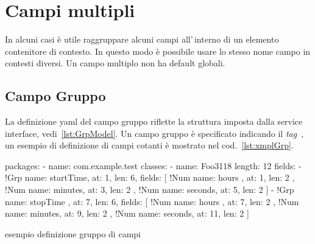 \documentclass[a4paper,10pt]{report}
\newif\ifesource
\newenvironment{elisting}[1][H]
  {\captionsetup{aboveskip=0pt}\begin{listing}[#1]}
  {\end{listing}%
}
\begin{document}
\section{Campi multipli}
In alcuni casi è utile raggruppare alcuni campi all'\,interno di un elemento
contenitore di contesto. In questo modo è possibile usare lo stesso nome campo
in contesti diversi. Un campo multiplo non ha default globali.

\subsection{Campo Gruppo} \label{sub:yaml.grp}
La definizione yaml del campo gruppo riflette la struttura imposta dalla
service interface, vedi~\ref{lst:GrpModel}.
Un campo gruppo è specificato indicando il \textsl{tag} 
\,, 
un esempio di definizione di campi cotanti è mostrato nel 
cod.~\ref{lst:xmplGrp}.

\ifesource
\begin{figure*}[!htb]
\begin{lstlisting}[language=yaml, 
caption={esempio definizione gruppo di campi}, 
label=lst:xmplGrp]
packages:
  - name: com.example.test
    classes:
      - name: Foo3118
        length: 12
        fields:
          - !Grp { name: startTime, at: 1, len: 6, fields: [
            !Num { name: hours  , at: 1, len: 2 }, 
            !Num { name: minutes, at: 3, len: 2 }, 
            !Num { name: seconds, at: 5, len: 2 }
            ] }
          - !Grp { name: stopTime , at: 7, len: 6, fields: [
            !Num { name: hours  , at:  7, len: 2 }, 
            !Num { name: minutes, at:  9, len: 2 }, 
            !Num { name: seconds, at: 11, len: 2 }
            ] }
\end{lstlisting}
\end{figure*}
\else
\begin{elisting}[!htb]
\begin{yamlcode}
packages:
  - name: com.example.test
    classes:
      - name: Foo3118
        length: 12
        fields:
          - !Grp { name: startTime, at: 1, len: 6, fields: [
            !Num { name: hours  , at: 1, len: 2 }, 
            !Num { name: minutes, at: 3, len: 2 }, 
            !Num { name: seconds, at: 5, len: 2 }
            ] }
          - !Grp { name: stopTime , at: 7, len: 6, fields: [
            !Num { name: hours  , at:  7, len: 2 }, 
            !Num { name: minutes, at:  9, len: 2 }, 
            !Num { name: seconds, at: 11, len: 2 }
            ] }
\end{yamlcode}
\caption{esempio definizione gruppo di campi}
\label{lst:xmplGrp}
\end{elisting}
\fi
\end{document}
